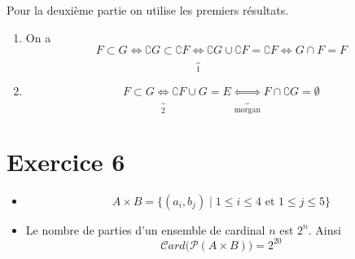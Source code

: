 \documentclass{report}
\begin{document}
\begin{myproof}
\begin{enumerate}
\begin{itemize}
       \end{itemize}

   
 \end{enumerate}

 Pour la deuxième partie on utilise les premiers résultats.

 \begin{enumerate}
   \item On a $$
     F \subset G \iff \complement G \subset \complement
     F\underbrace{\iff}_{\text{1}} \complement G \cup \complement F = \complement
     F \iff G \cap F = F
     $$
   \item 
     $$
     F \subset G \underbrace{\iff}_{2} \complement F \cup G = E
     \underbrace{\iff}_{\text{morgan}} F \cap \complement G = \emptyset
     $$
 \end{enumerate}
  
\end{myproof}

\section{Exercice 6} 
\begin{myproof}
  
  \begin{itemize}
    \item 
      $$
      A\times B = \{(a_i, b_j)\; |\;  1\leq i \leq 4 \text{ et } 1 \leq j \leq 5\}
      $$
    \item Le nombre de parties d'un ensemble de cardinal $n$ est $2^n$. Ainsi 
      $$
      \mathcal{C}ard\big(\mathcal{P}(A \times B)\big) = 2^{20}
      $$
  \end{itemize}
\end{myproof}




\end{document}
